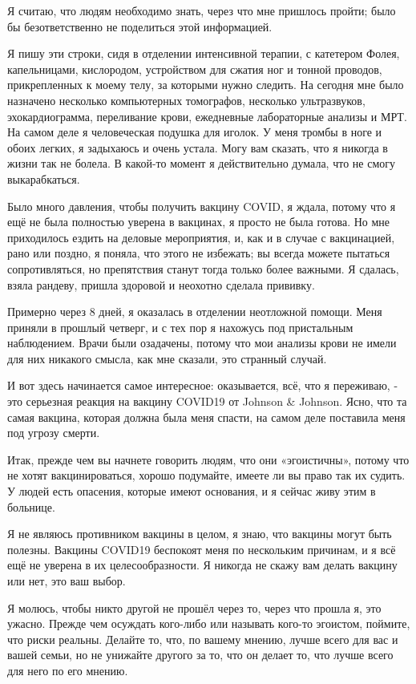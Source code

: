 Я считаю, что людям необходимо знать, через что мне пришлось пройти; было бы
безответственно не поделиться этой информацией.

Я пишу эти строки, сидя в отделении интенсивной терапии, с катетером Фолея,
капельницами, кислородом, устройством для сжатия ног и тонной проводов,
прикрепленных к моему телу, за которыми нужно следить. На сегодня мне было
назначено несколько компьютерных томографов, несколько ультразвуков,
эхокардиограмма, переливание крови, ежедневные лабораторные анализы и МРТ. На
самом деле я человеческая подушка для иголок. У меня тромбы в ноге и обоих
легких, я задыхаюсь и очень устала. Могу вам сказать, что я никогда в жизни так
не болела. В какой-то момент я действительно думала, что не смогу выкарабкаться.

Было много давления, чтобы получить вакцину COVID, я ждала, потому что я ещё не
была полностью уверена в вакцинах, я просто не была готова. Но мне приходилось
ездить на деловые мероприятия, и, как и в случае с вакцинацией, рано или поздно,
я поняла, что этого не избежать; вы всегда можете пытаться сопротивляться, но
препятствия станут тогда только более важными. Я сдалась, взяла рандеву, пришла
здоровой и неохотно сделала прививку.

Примерно через 8 дней, я оказалась в отделении неотложной помощи. Меня приняли в
прошлый четверг, и с тех пор я нахожусь под пристальным наблюдением. Врачи были
озадачены, потому что мои анализы крови не имели для них никакого смысла, как
мне сказали, это странный случай.

И вот здесь начинается самое интересное: оказывается, всё, что я переживаю, -
это серьезная реакция на вакцину COVID19 от Johnson \& Johnson. Ясно, что та
самая вакцина, которая должна была меня спасти, на самом деле поставила меня под
угрозу смерти.

Итак, прежде чем вы начнете говорить людям, что они «эгоистичны», потому что не
хотят вакцинироваться, хорошо подумайте, имеете ли вы право так их судить. У
людей есть опасения, которые имеют основания, и я сейчас живу этим в больнице.

Я не являюсь противником вакцины в целом, я знаю, что вакцины могут быть
полезны. Вакцины COVID19 беспокоят меня по нескольким причинам, и я всё ещё не
уверена в их целесообразности. Я никогда не скажу вам делать вакцину или нет,
это ваш выбор.

Я молюсь, чтобы никто другой не прошёл через то, через что прошла я, это
ужасно. Прежде чем осуждать кого-либо или называть кого-то эгоистом, поймите,
что риски реальны. Делайте то, что, по вашему мнению, лучше всего для вас и
вашей семьи, но не унижайте другого за то, что он делает то, что лучше всего для
него по его мнению.
